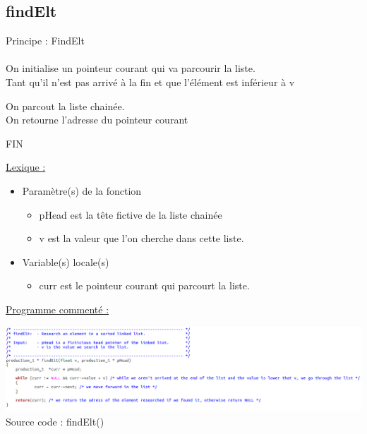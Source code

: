 \documentclass[a4paper]{article}
\newcommand\tab[1][1cm]{\hspace*{#1}}
\begin{document}
\subsection{findElt}
\begin{algorithm}
Principe : FindElt
\\
\\
\tab On initialise un pointeur courant qui va parcourir la liste. 
\\
\tab Tant qu'il n'est pas arrivé à la fin et que l'élément est inférieur à v 

\tab \tab On parcout la liste chainée.
\\
\tab On retourne l'adresse du pointeur courant 

FIN
\end{algorithm}
\underline{Lexique :}
\begin{itemize}
\item Paramètre(s) de la fonction  
\begin{itemize}
\item pHead est la tête fictive de la liste chainée
\item v est la valeur que l'on cherche dans cette liste.
\end{itemize}
\item Variable(s) locale(s)
\begin{itemize}
\item curr est le pointeur courant qui parcourt la liste.
\end{itemize}
\end{itemize}
\underline{Programme commenté :}
\begin{center}
\includegraphics[scale=0.39]{findElt.png}
Source code : findElt()
\end{center}
\end{document}
